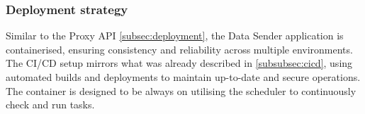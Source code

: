 \subsubsection{Deployment strategy}
Similar to the Proxy API \ref{subsec:deployment}, the Data Sender application is containerised, ensuring consistency and reliability across multiple environments.
The CI/CD setup mirrors what was already described in \ref{subsubsec:cicd}, using automated builds and deployments to maintain up-to-date and secure operations. 
The container is designed to be always on utilising the scheduler to continuously check and run tasks.
